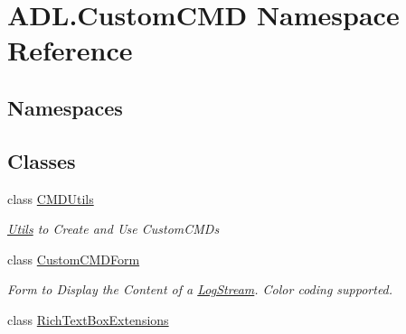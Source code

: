\hypertarget{namespace_a_d_l_1_1_custom_c_m_d}{}\section{A\+D\+L.\+Custom\+C\+MD Namespace Reference}
\label{namespace_a_d_l_1_1_custom_c_m_d}
\subsection*{Namespaces}
\begin{DoxyCompactItemize}
\end{DoxyCompactItemize}
\subsection*{Classes}
\begin{DoxyCompactItemize}
\item 
class \mbox{\hyperlink{class_a_d_l_1_1_custom_c_m_d_1_1_c_m_d_utils}{C\+M\+D\+Utils}}
\begin{DoxyCompactList}\small\item\em \mbox{\hyperlink{class_a_d_l_1_1_utils}{Utils}} to Create and Use Custom\+C\+M\+Ds \end{DoxyCompactList}\item 
class \mbox{\hyperlink{class_a_d_l_1_1_custom_c_m_d_1_1_custom_c_m_d_form}{Custom\+C\+M\+D\+Form}}
\begin{DoxyCompactList}\small\item\em Form to Display the Content of a \mbox{\hyperlink{class_a_d_l_1_1_log_stream}{Log\+Stream}}. Color coding supported. \end{DoxyCompactList}\item 
class \mbox{\hyperlink{class_a_d_l_1_1_custom_c_m_d_1_1_rich_text_box_extensions}{Rich\+Text\+Box\+Extensions}}
\end{DoxyCompactItemize}
